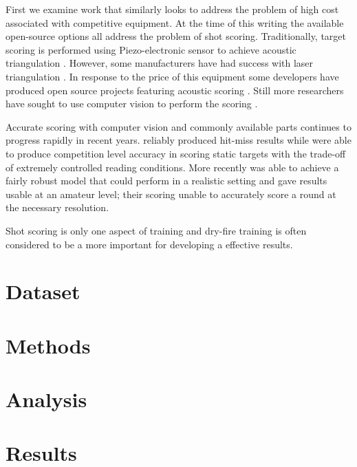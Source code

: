 \documentclass[conference]{IEEEtran}
\begin{document}

First we examine work that similarly looks to address the problem of high cost associated with competitive equipment.
At the time of this writing the available open-source options all address the problem of shot scoring.
Traditionally, target scoring is performed using Piezo-electronic sensor to achieve acoustic triangulation \cite{Anderson2018}.
However, some manufacturers have had success with laser triangulation \cite{SUIS}.
In response to the price of this equipment some developers have produced open source projects featuring acoustic scoring \cite{etarg} \cite{freetarget}.
Still more researchers have sought to use computer vision to perform the scoring \cite{Rudzinski2012} \cite{Stenhager2021}.

Accurate scoring with computer vision and commonly available parts continues to progress rapidly in recent years.
\cite{Ye2011} reliably produced  hit-miss results while \cite{Rudzinski2012} were able to produce competition level accuracy in scoring static targets with the trade-off of extremely controlled reading conditions.
More recently \cite{Stenhager2021} was able to achieve a fairly robust model that could perform in a realistic setting and gave results usable at an amateur level; their scoring unable to accurately score a round at the necessary resolution.


Shot scoring is only one aspect of training and dry-fire training is often \cite{Potter2017}
considered to be a more important for developing a effective results.


\section{Dataset}


\section{Methods}
\section{Analysis}
\section{Results}
\end{document}
